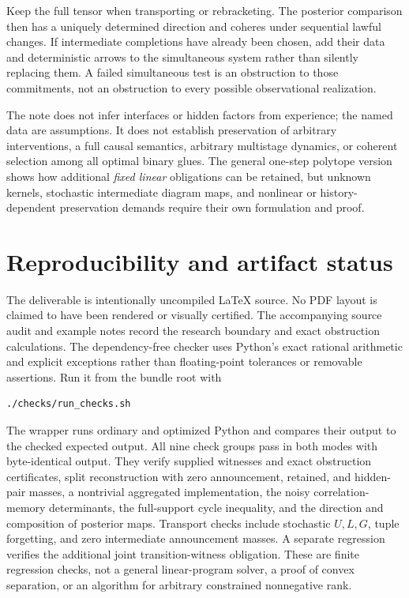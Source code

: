 \documentclass[11pt]{article}
\theoremstyle{remark}
\begin{document}
Keep the full tensor when transporting or rebracketing. The posterior comparison then has a uniquely determined direction and coheres under sequential lawful changes. If intermediate completions have already been chosen, add their data and deterministic arrows to the simultaneous system rather than silently replacing them. A failed simultaneous test is an obstruction to those commitments, not an obstruction to every possible observational realization.

The note does not infer interfaces or hidden factors from experience; the named data are assumptions. It does not establish preservation of arbitrary interventions, a full causal semantics, arbitrary multistage dynamics, or coherent selection among all optimal binary glues. The general one-step polytope version shows how additional \emph{fixed linear} obligations can be retained, but unknown kernels, stochastic intermediate diagram maps, and nonlinear or history-dependent preservation demands require their own formulation and proof.

\section{Reproducibility and artifact status}\label{sec:reproducibility}

The deliverable is intentionally uncompiled \LaTeX{} source. No PDF layout is claimed to have been rendered or visually certified. The accompanying source audit and example notes record the research boundary and exact obstruction calculations. The dependency-free checker uses Python's exact rational arithmetic and explicit exceptions rather than floating-point tolerances or removable assertions. Run it from the bundle root with
\begin{verbatim}
./checks/run_checks.sh
\end{verbatim}
The wrapper runs ordinary and optimized Python and compares their output to the checked expected output. All nine check groups pass in both modes with byte-identical output. They verify supplied witnesses and exact obstruction certificates, split reconstruction with zero announcement, retained, and hidden-pair masses, a nontrivial aggregated implementation, the noisy correlation-memory determinants, the full-support cycle inequality, and the direction and composition of posterior maps. Transport checks include stochastic $U,L,G$, tuple forgetting, and zero intermediate announcement masses. A separate regression verifies the additional joint transition-witness obligation. These are finite regression checks, not a general linear-program solver, a proof of convex separation, or an algorithm for arbitrary constrained nonnegative rank.
\end{document}
